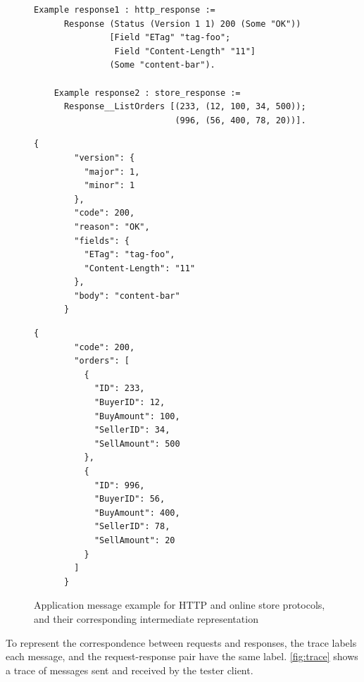 \documentclass{article}
\theoremstyle{definition}
\begin{document}
\begin{figure}
  \begin{lstlisting}[style=customcoq]
    Example response1 : http_response :=
      Response (Status (Version 1 1) 200 (Some "OK"))
               [Field "ETag" "tag-foo";
                Field "Content-Length" "11"]
               (Some "content-bar").

    Example response2 : store_response :=
      Response__ListOrders [(233, (12, 100, 34, 500));
                            (996, (56, 400, 78, 20))].
  \end{lstlisting}
  \begin{minipage}[t]{.4\textwidth}
    \begin{lstlisting}[style=json]
      {
        "version": {
          "major": 1,
          "minor": 1
        },
        "code": 200,
        "reason": "OK",
        "fields": {
          "ETag": "tag-foo",
          "Content-Length": "11"
        },
        "body": "content-bar"
      }
    \end{lstlisting}
  \end{minipage}%
  \begin{minipage}[t]{.4\textwidth}
    \begin{lstlisting}[style=json]
      {
        "code": 200,
        "orders": [
          {
            "ID": 233,
            "BuyerID": 12,
            "BuyAmount": 100,
            "SellerID": 34,
            "SellAmount": 500
          },
          {
            "ID": 996,
            "BuyerID": 56,
            "BuyAmount": 400,
            "SellerID": 78,
            "SellAmount": 20
          }
        ]
      }
    \end{lstlisting}
  \end{minipage}
  \caption{Application message example for HTTP and online store protocols, and
    their corresponding intermediate representation}
  \label{fig:ir}
\end{figure}

To represent the correspondence between requests and responses, the trace labels
each message, and the request-response pair have the same label.
\autoref{fig:trace} shows a trace of messages sent and received by the tester
client.
\end{document}
